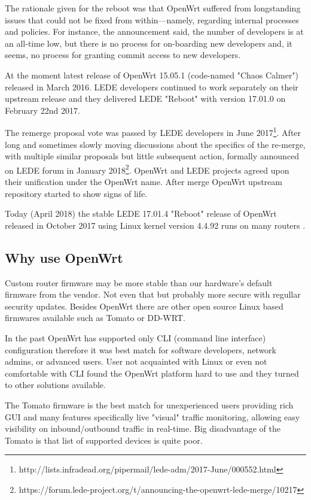 The rationale given for the reboot was that OpenWrt suffered from longstanding issues that could not be fixed from within—namely, regarding internal processes and policies.
For instance, the announcement said, the number of developers is at an all-time low, but there is no process for on-boarding new developers and, it seems, no process for granting commit access to new developers.

At the moment latest release of OpenWrt 15.05.1 (code-named "Chaos Calmer") released in March 2016.
LEDE developers continued to work separately on their upstream release and they delivered LEDE "Reboot" with version 17.01.0 on February 22nd 2017.

The remerge proposal vote was passed by LEDE developers in June 2017\footnote{http://lists.infradead.org/pipermail/lede-adm/2017-June/000552.html}.
After long and sometimes slowly moving discussions about the specifics of the re-merge, with multiple similar proposals but little subsequent action, formally announced on LEDE forum in January 2018\footnote{https://forum.lede-project.org/t/announcing-the-openwrt-lede-merge/10217}.
OpenWrt and LEDE projects agreed upon their unification under the OpenWrt name.
After merge OpenWrt upstream repository started to show signs of life.

Today (April 2018) the stable LEDE 17.01.4 "Reboot" release of OpenWrt released in October 2017 using Linux kernel version 4.4.92 runs on many routers \cite{lede_release}.

\subsection{Why use OpenWrt}

Custom router firmware may be more stable than our hardware’s default firmware from the vendor.
Not even that but probably more secure with regullar security updates.
Besides OpenWrt there are other open source Linux based firmwares available such as Tomato or DD-WRT.

In the past OpenWrt has supported only CLI (command line interface) configuration therefore it was best match for software developers, network admins, or advanced users.
User not acquainted with Linux or even not comfortable with CLI found the OpenWrt platform hard to use and they turned to other solutions available.

The Tomato firmware is the best match for unexperienced users providing rich GUI and many features specifically live "visual" traffic monitoring, allowing easy visibility on inbound/outbound traffic in real-time.
Big disadvantage of the Tomato is that list of supported devices is quite poor.

